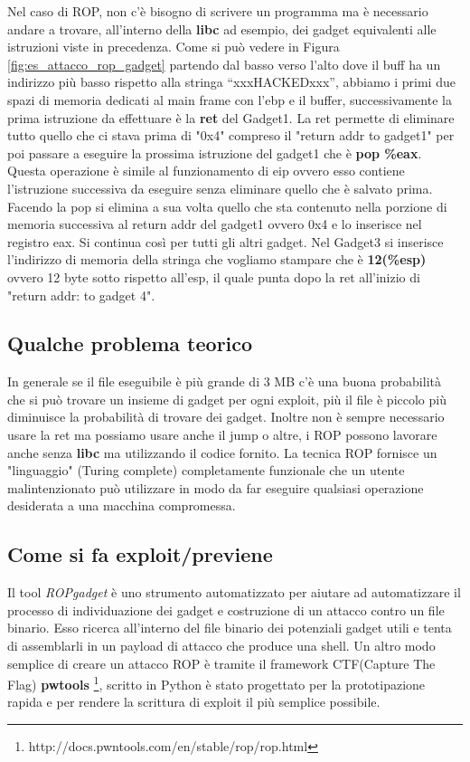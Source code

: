 Nel caso di ROP, non c'è bisogno di scrivere un programma ma è necessario andare a
trovare, all'interno della \textbf{libc} ad esempio, dei gadget equivalenti alle
istruzioni viste in precedenza.
Come si può vedere in Figura \ref{fig:es_attacco_rop_gadget} partendo dal basso verso
l'alto dove il buff ha un indirizzo più basso rispetto
alla stringa “xxxHACKEDxxx”, abbiamo i primi due spazi di memoria dedicati al main
frame con l'ebp e il buffer,
successivamente la prima istruzione da effettuare è la \textbf{ret} del Gadget1.
La ret permette di eliminare tutto quello che ci stava prima di "0x4" compreso il
"return addr to gadget1" per poi passare a eseguire la prossima
istruzione del gadget1 che è \textbf{pop \%eax}.
Questa operazione è simile al funzionamento di eip ovvero esso contiene l'istruzione
successiva da eseguire senza eliminare quello che è salvato prima.
Facendo la pop si elimina a sua volta quello che sta contenuto nella porzione di
memoria successiva al return addr del gadget1 ovvero 0x4 e lo
inserisce nel registro eax. Si continua così per tutti gli altri gadget.
Nel Gadget3 si inserisce l'indirizzo di memoria della stringa che vogliamo stampare
che è \textbf{12(\%esp)}
ovvero 12 byte sotto rispetto all'esp, il quale punta dopo la ret all'inizio
di "return addr: to gadget 4".

\subsection{Qualche problema teorico}

In generale se il file eseguibile è più grande di 3 MB c'è una buona probabilità
che si può trovare un insieme di gadget per ogni exploit, più il file è piccolo più
diminuisce la probabilità di trovare dei gadget. Inoltre non è sempre necessario usare
la ret ma possiamo usare anche il jump o altre, i ROP possono lavorare anche
senza \textbf{libc} ma utilizzando il codice fornito. La tecnica ROP fornisce un
"linguaggio" (Turing complete) completamente funzionale che un utente malintenzionato
può utilizzare
in modo da far eseguire  qualsiasi operazione desiderata a una macchina compromessa.

\subsection{Come si fa exploit/previene}

Il tool \textit{ROPgadget} è uno strumento automatizzato per aiutare ad automatizzare
il processo di individuazione dei gadget e costruzione di un attacco contro un file
binario. Esso ricerca all'interno del file binario dei potenziali gadget utili e
tenta di assemblarli in un payload di attacco che produce una shell. Un altro modo
semplice di creare un attacco ROP è tramite il framework
CTF(Capture The Flag) \textbf{pwtools} \footnote{http://docs.pwntools.com/en/stable/rop/rop.html},
scritto in Python è stato progettato per la prototipazione rapida e per rendere
la scrittura di exploit il più semplice possibile.


